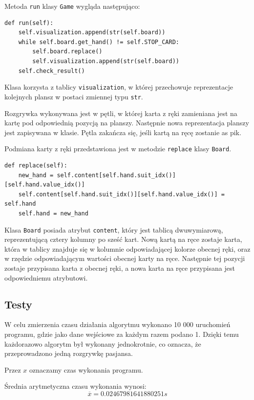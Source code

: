 \documentclass[12pt,a4paper]{article}
\begin{document}
Metoda \texttt{run} klasy \texttt{Game} wygląda następująco:
\begin{lstlisting}
def run(self):
    self.visualization.append(str(self.board))
    while self.board.get_hand() != self.STOP_CARD:
        self.board.replace()
        self.visualization.append(str(self.board))
    self.check_result()
\end{lstlisting}

Klasa korzysta z tablicy \texttt{visualization}, w której przechowuje reprezentacje kolejnych plansz w postaci zmiennej typu \texttt{str}.

Rozgrywka wykonywana jest w pętli, w której karta z ręki zamieniana jest na kartę pod odpowiednią pozycją na planszy. Następnie nowa reprezentacja planszy jest zapisywana w klasie. Pętla zakańcza się, jeśli kartą na ręcę zostanie as pik.

Podmiana karty z ręki przedstawiona jest w metodzie \texttt{replace} klasy \texttt{Board}.

\begin{lstlisting}
def replace(self):
    new_hand = self.content[self.hand.suit_idx()][self.hand.value_idx()]
    self.content[self.hand.suit_idx()][self.hand.value_idx()] = self.hand
    self.hand = new_hand
\end{lstlisting}

Klasa \texttt{Board} posiada atrybut \texttt{content}, który jest tablicą dwuwymiarową, reprezentującą cztery kolumny po sześć kart. Nową kartą na ręce zostaje karta, która w tablicy znajduje się w kolumnie odpowiadającej kolorze obecnej ręki, oraz w rzędzie odpowiadającym wartości obecnej karty na ręce. Następnie tej pozycji zostaje przypisana karta z obecnej ręki, a nowa karta na ręce przypisana jest odpowiedniemu atrybutowi.

\subsection*{Testy}
W celu zmierzenia czasu działania algorytmu wykonano 10 000 uruchomień programu, gdzie jako dane wejściowe za każdym razem podano 1. Dzięki temu każdorazowo algorytm był wykonany jednokrotnie, co oznacza, że przeprowadzono jedną rozgrywkę pasjansa.

Przez $x$ oznaczamy czas wykonania programu.

Średnia arytmetyczna czasu wykonania wynosi:
\begin{equation}
    \overline{x} = 0.02467981641880251 s
\end{equation}
\end{document}
